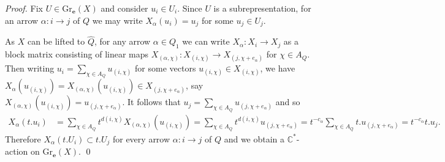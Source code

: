\documentclass[smallextended,envcountsect,envcountsame]{svjour3}
\numberwithin{equation}{section}
\newcommand{\CC}{\mathbb{C}}
\newcommand{\bfe}{\mathbf{e}}
\newcommand{\Gr}{\mathrm{Gr}}
\begin{document}
\begin{proof} 
  Fix $U\in\Gr_\bfe(X)$ and consider $u_i\in U_i$.
  Since $U$ is a subrepresentation, for an arrow $\alpha:i\to j$ of $Q$ we may write $X_\alpha(u_i)=u_j$ for some $u_j\in U_j$.

  As $X$ can be lifted to $\hat Q$, for any arrow $\alpha\in Q_1$ we can write $X_\alpha:X_i\to X_j$ as a block matrix consisting of linear maps $X_{(\alpha,\chi)}:X_{(i,\chi)}\to X_{(j,\chi+e_\alpha)}$ for $\chi\in A_Q$.
  Then writing $u_i=\sum_{\chi\in A_Q} u_{(i,\chi)}$ for some vectors $u_{(i,\chi)}\in X_{(i,\chi)}$, we have $X_\alpha(u_{(i,\chi)})=X_{(\alpha,\chi)}(u_{(i,\chi)})\in X_{(j,\chi+e_\alpha)}$, say $X_{(\alpha,\chi)}(u_{(i,\chi)})=u_{(j,\chi+e_\alpha)}$.
  It follows that $u_j=\sum_{\chi\in A_Q} u_{(j,\chi+e_\alpha)}$ and so
  \begin{align*}
    X_\alpha(t.u_i)
    &=\sum\limits_{\chi\in A_Q} t^{d(i,\chi)}X_{(\alpha,\chi)}(u_{(i,\chi)})=\sum\limits_{\chi\in A_Q} t^{d(i,\chi)}u_{(j,\chi+e_\alpha)}=t^{-c_\alpha}\sum\limits_{\chi\in A_Q} t.u_{(j,\chi+e_\alpha)}=t^{-c_\alpha} t.u_j.
  \end{align*}
  Therefore $X_\alpha(t.U_i)\subset t.U_j$ for every arrow $\alpha:i\to j$ of $Q$ and we obtain a $\CC^*$-action on $\Gr_\bfe(X)$.
\qed\end{proof}
\end{document}
